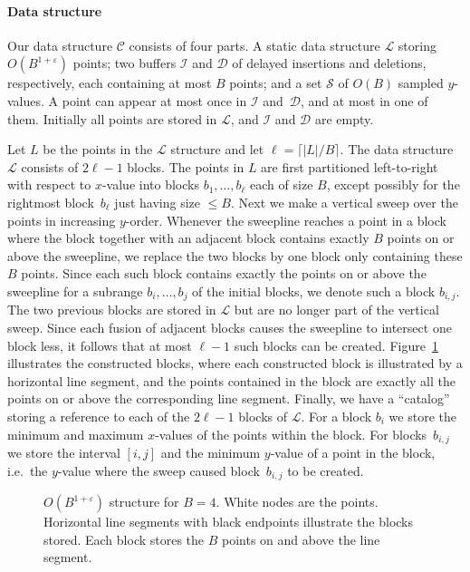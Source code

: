 \documentclass[11pt]{article}
\begin{document}
\paragraph*{Data structure}

Our data structure $\mathcal{C}$ consists of four parts. A static data
structure $\mathcal{L}$ storing $O(B^{1+\varepsilon})$ points; two
buffers $\mathcal{I}$ and $\mathcal{D}$ of delayed insertions and
deletions, respectively, each containing at most $B$ points; and a set
$\mathcal{S}$ of $O(B)$ sampled $y$-values.  A point can appear at
most once in $\mathcal{I}$ and~$\mathcal{D}$, and at most in one of
them.  Initially all points are stored in $\mathcal{L}$, and
$\mathcal{I}$ and $\mathcal{D}$ are empty.

Let $L$ be the points in the $\mathcal{L}$ structure and let
$\ell=\lceil |L|/B\rceil$.  The data structure $\mathcal{L}$ consists
of $2\ell-1$ blocks. The points in $L$ are first partitioned
left-to-right with respect to $x$-value into blocks
$b_1,\ldots,b_\ell$ each of size $B$, except possibly for the
rightmost block~$b_\ell$ just having size $\leq B$. Next we make a
vertical sweep over the points in increasing $y$-order. Whenever the
sweepline reaches a point in a block where the block together with an
adjacent block contains exactly $B$ points on or above the sweepline,
we replace the two blocks by one block only containing these $B$
points. Since each such block contains exactly the points on or above
the sweepline for a subrange $b_i,\ldots,b_j$ of the initial blocks,
we denote such a block $b_{i,j}$.  The two previous blocks are stored
in $\mathcal{L}$ but are no longer part of the vertical sweep.  Since
each fusion of adjacent blocks causes the sweepline to intersect one
block less, it follows that at most $\ell-1$ such blocks can be
created.
%
Figure~\ref{fig:child-structure} illustrates the constructed blocks,
where each constructed block is illustrated by a horizontal line
segment, and the points contained in the block are exactly all the
points on or above the corresponding line segment.
%
Finally, we have a ``catalog'' storing a reference to each of the
$2\ell-1$ blocks of $\mathcal{L}$.  For a block $b_i$ we store the
minimum and maximum $x$-values of the points within the block. For
blocks~$b_{i,j}$ we store the interval $[i,j]$ and the minimum
$y$-value of a point in the block, i.e.\ the $y$-value where the sweep
caused block~$b_{i,j}$ to be created.
\begin{figure}[t]
  \centerline{}
  \caption{$O(B^{1+\varepsilon})$ structure for $B=4$. White nodes are
    the points. Horizontal line segments with black endpoints
    illustrate the blocks stored. Each block stores the $B$ points on
    and above the line segment.}
  \label{fig:child-structure}
\end{figure}
\end{document}
